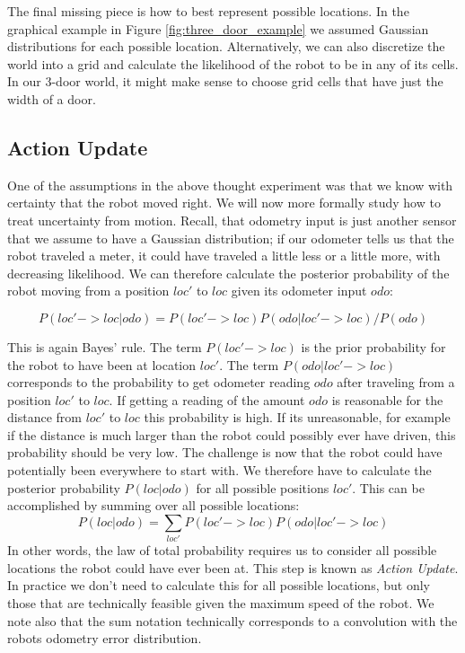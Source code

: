 The final missing piece is how to best represent possible locations. In the graphical example in Figure \ref{fig:three_door_example} we assumed Gaussian distributions for each possible location. Alternatively, we can also discretize the world into a grid and calculate the likelihood of the robot to be in any of its cells. In our 3-door world, it might make sense to choose grid cells that have just the width of a door.

\subsection{Action Update}
One of the assumptions in the above thought experiment was that we know with certainty that the robot moved right. We will now more formally study how to treat uncertainty from motion. Recall, that odometry input is just another sensor that we assume to have a Gaussian distribution; if our odometer tells us that the robot traveled a meter, it could have traveled a  little less or a little more, with decreasing likelihood. We can therefore calculate the posterior probability of the robot moving from a position $loc'$ to $loc$ given its odometer input $odo$:

\begin{equation}
P(loc'->loc|odo)=P(loc'->loc)P(odo|loc'->loc)/P(odo)
\end{equation}

This is again Bayes' rule. The term $P(loc'->loc)$ is the prior probability for the robot to have been at location $loc'$. The term $ P(odo|loc'->loc)$ corresponds to the probability to get odometer reading $odo$ after traveling from a position $loc'$ to $loc$. If getting a reading of the amount $odo$ is reasonable for the distance from $loc'$ to $loc$ this probability is high. If its unreasonable, for example if the distance is much larger than the robot could possibly ever have driven, this probability should be very low. The challenge is now that the robot could have potentially been everywhere to start with. We therefore have to calculate the posterior probability $P(loc|odo)$ for all possible positions $loc'$. This can be accomplished by summing over all possible locations:
\begin{equation}
P(loc|odo)=\sum_{loc'}P(loc'->loc)P(odo|loc'->loc)
\end{equation}
In other words, the law of total probability requires us to consider all possible locations the robot could have ever been at. This step is known as \emph{Action Update}. In practice we don't need to calculate this for all possible locations, but only those that are technically feasible given the maximum speed of the robot. We note also that the sum notation technically corresponds to a convolution with the robots odometry error distribution.

